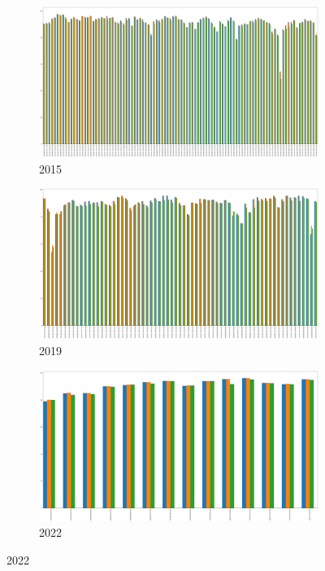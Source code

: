 \begin{figure}[h]
	\centering
	\caption{Before, after and daily FFMC maximum value}
	\begin{subfigure}{0.45\textwidth}
		\centering
		\includegraphics[width=\textwidth]{graphs/2015/byHour/FFMC_max_before_after.png}
		\caption{2015}
	\end{subfigure}
	\hfill
	\begin{subfigure}{0.45\textwidth}
		\centering
		\includegraphics[width=\textwidth]{graphs/2019/byHour/FFMC_max_before_after.png}
		\caption{2019}
	\end{subfigure}
	\hfill
	\begin{subfigure}{0.45\textwidth}
		\centering
		\includegraphics[width=\textwidth]{graphs/2022/FFMC_max_before_after.png}
		\caption{2022}
	\end{subfigure}
	\label{fig:daily_ffmc_after_before_max}
\end{figure}

